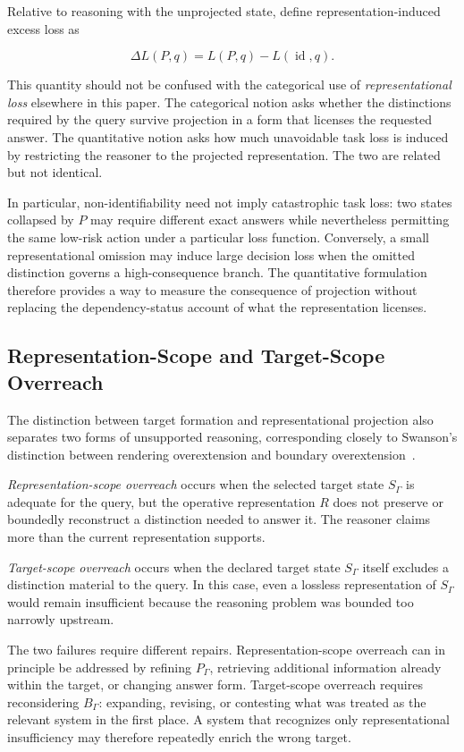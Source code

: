 \documentclass[11pt]{article}
\begin{document}
Relative to reasoning with the unprojected state, define representation-induced excess loss as

\[
\Delta L(P,q)
=
L(P,q)-L(\operatorname{id},q).
\]

This quantity should not be confused with the categorical use of \emph{representational loss} elsewhere in this paper. The categorical notion asks whether the distinctions required by the query survive projection in a form that licenses the requested answer. The quantitative notion asks how much unavoidable task loss is induced by restricting the reasoner to the projected representation. The two are related but not identical.

In particular, non-identifiability need not imply catastrophic task loss: two states collapsed by \(P\) may require different exact answers while nevertheless permitting the same low-risk action under a particular loss function. Conversely, a small representational omission may induce large decision loss when the omitted distinction governs a high-consequence branch. The quantitative formulation therefore provides a way to measure the consequence of projection without replacing the dependency-status account of what the representation licenses.

\subsection{Representation-Scope and Target-Scope Overreach}

The distinction between target formation and representational projection also separates two forms of unsupported reasoning, corresponding closely to Swanson's distinction between rendering overextension and boundary overextension~\cite{Swanson2026Monist}.

\emph{Representation-scope overreach} occurs when the selected target state \(S_{\Gamma}\) is adequate for the query, but the operative representation \(R\) does not preserve or boundedly reconstruct a distinction needed to answer it. The reasoner claims more than the current representation supports.

\emph{Target-scope overreach} occurs when the declared target state \(S_{\Gamma}\) itself excludes a distinction material to the query. In this case, even a lossless representation of \(S_{\Gamma}\) would remain insufficient because the reasoning problem was bounded too narrowly upstream.

The two failures require different repairs. Representation-scope overreach can in principle be addressed by refining \(P_{\Gamma}\), retrieving additional information already within the target, or changing answer form. Target-scope overreach requires reconsidering \(B_{\Gamma}\): expanding, revising, or contesting what was treated as the relevant system in the first place. A system that recognizes only representational insufficiency may therefore repeatedly enrich the wrong target.
\end{document}
